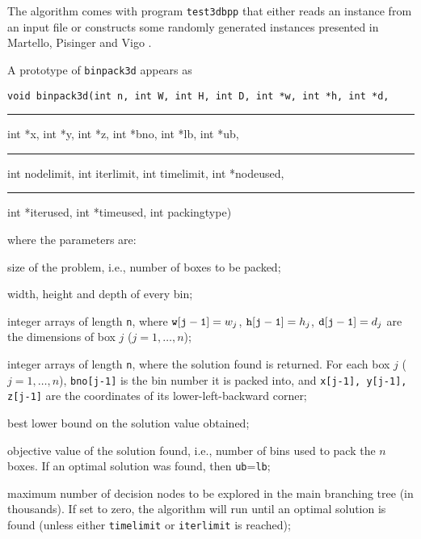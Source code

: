 The algorithm comes with program  {\tt test3dbpp}
that either reads an instance from an input file or constructs some randomly
generated instances presented in Martello, Pisinger and Vigo \cite{MarPisVig98}.

A prototype of {\tt binpack3d} appears as
\begin{flushleft}
\tt void binpack3d(int n, int W, int H, int D,
            int *w, int *h, int *d, \\ \rule{28mm}{0mm}
            int *x, int *y, int *z, int *bno,
            int *lb, int *ub,\\ \rule{28mm}{0mm}
            int nodelimit, int iterlimit, int timelimit,
            int *nodeused,\\ \rule{28mm}{0mm}
            int *iterused, int *timeused, int packingtype)
\end{flushleft}
%
where the parameters are:
\medskip

\noindent
{} \parbox[t]{13.0cm}{size of the
problem, i.e., number of boxes to be packed;}
\medskip

\noindent
{} \parbox[t]{13.0cm}{width, height and
depth of every bin;}
\medskip

\noindent
{}
\parbox[t]{13.0cm}{integer arrays of length {\tt n}, where ${\tt
w[j-1]}=w_j$, ${\tt h[j-1]}=h_j$, ${\tt d[j-1]}=d_j$ are the
dimensions of box $j$ ($j=1, \dots, n$);}
\medskip

\noindent
{} \parbox[t]{13.0cm}{integer
arrays of length {\tt n}, where the solution found is returned.
For each box $j$ ($j=1,\dots,n$), {\tt bno[j-1]} is the bin number
it is packed into, and {\tt x[j-1], y[j-1], z[j-1]} are the
coordinates of its lower-left-backward corner;}
\medskip

\noindent
{} \parbox[t]{13.0cm}{best lower bound on
the solution value obtained;}\medskip

\noindent
{}
\parbox[t]{13.0cm}{objective value of the solution found, i.e.,
number of bins used to pack the $n$ boxes. If an optimal solution
was found, then {\tt ub}={\tt lb};}\medskip

\noindent
{}
\parbox[t]{13.0cm}{maximum number of decision nodes to be explored
in the main branching tree (in thousands).
If set to zero, the algorithm will run until an optimal solution is
found ({unless either} {\tt timelimit} or {\tt iterlimit} is reached);}
\medskip

